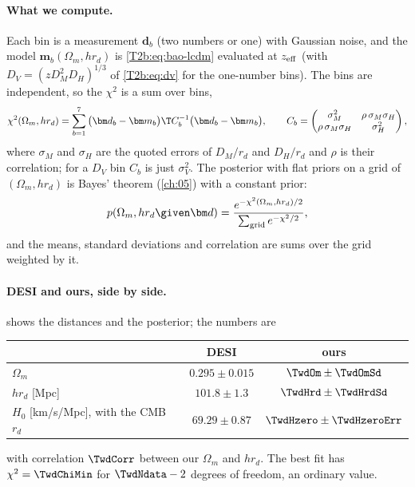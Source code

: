 \paragraph{What we compute.} Each bin is a measurement $\bm d_b$ (two numbers or one) with Gaussian noise, and the model $\bm m_b(\Omega_m,hr_d)$ is \eqref{T2b:eq:bao-lcdm} evaluated at $z_{\rm eff}$ (with $D_V=(zD_M^2D_H)^{1/3}$ of \eqref{T2b:eq:dv} for the one-number bins). The bins are independent, so the $\chi^2$ is a sum over bins,
\begin{equation}
  \chi^2(\Omega_m,hr_d)=\sum_{b=1}^{7}\big(\bm d_b-\bm m_b\big)\T C_b^{-1}\big(\bm d_b-\bm m_b\big),
  \qquad
  C_b=\begin{pmatrix}\sigma_M^2&\rho\,\sigma_M\sigma_H\\ \rho\,\sigma_M\sigma_H&\sigma_H^2\end{pmatrix},
  \label{T2b:eq:desi-chi2}
\end{equation}
where $\sigma_M$ and $\sigma_H$ are the quoted errors of $D_M/r_d$ and $D_H/r_d$ and $\rho$ is their correlation; for a $D_V$ bin $C_b$ is just $\sigma_V^2$. The posterior with flat priors on a grid of $(\Omega_m,hr_d)$ is Bayes' theorem (\cref{ch:05}) with a constant prior:
\[
  p(\Omega_m,hr_d\given\bm d)=\frac{e^{-\chi^2(\Omega_m,hr_d)/2}}{\sum_{\rm grid}e^{-\chi^2/2}} ,
\]
and the means, standard deviations and correlation are sums over the grid weighted by it.

\paragraph{DESI and ours, side by side.}  shows the distances and the posterior; the numbers are
\begin{center}
\small
\begin{tabular}{@{}lcc@{}}
\toprule
 & DESI \cite[eqs.~(4.1), (4.3)]{DESI2024VI} & ours\\
\midrule
$\Omega_m$ & $0.295\pm0.015$ & $\TwdOm\pm\TwdOmSd$\\
$h r_d$ [Mpc] & $101.8\pm1.3$ & $\TwdHrd\pm\TwdHrdSd$\\
$H_0$ [km/s/Mpc], with the CMB $r_d$ & $69.29\pm0.87$ & $\TwdHzero\pm\TwdHzeroErr$\\
\bottomrule
\end{tabular}
\end{center}
with correlation $\TwdCorr$ between our $\Omega_m$ and $hr_d$. The best fit has $\chi^2=\TwdChiMin$ for $\TwdNdata-2$ degrees of freedom, an ordinary value.


